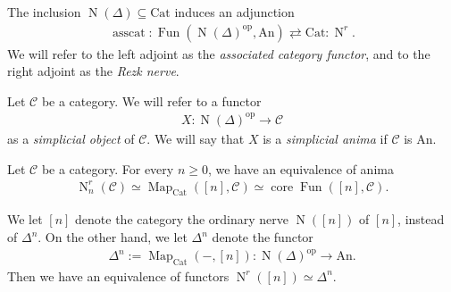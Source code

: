 \documentclass[a4paper,dvipdfmx,11pt,reqno]{amsart}
\DeclareMathOperator{\Map}{Map}
\DeclareMathOperator{\myop}{op}
\DeclareMathOperator{\N}{N}
\DeclareMathOperator{\Fun}{Fun}
\DeclareMathOperator{\core}{core}
\DeclareMathOperator{\asscat}{asscat}
\newcommand{\C}{\mathcal{C}}
\newcommand{\An}{\mathrm{An}}
\newcommand{\Cat}{\mathrm{Cat}}
\begin{document}
\begin{definition}
  The inclusion $\N(\Delta) \subseteq \Cat$ induces an adjunction 
  \begin{align*}
    \asscat : \Fun(\N(\Delta)^{\myop},\An) \rightleftarrows \Cat : \N^r.
  \end{align*}
  We will refer to the left adjoint as the \textit{associated category functor}, and to the right adjoint as the \textit{Rezk nerve}.
\end{definition}

\begin{definition}
  Let $\C$ be a category.
  We will refer to a functor 
  \begin{align*}
    X : \N(\Delta)^{\myop} \to \C
  \end{align*}
  as a \textit{simplicial object} of $\C$.
  We will say that $X$ is a \textit{simplicial anima} if $\C$ is $\An$.
\end{definition}

\begin{remark}
  Let $\C$ be a category.
  For every $n \geq 0$, we have an equivalence of anima
  \begin{align*}
    \N^r_n(\C) \simeq \Map_{\Cat}([n],\C) \simeq \core\Fun([n],\C).
  \end{align*}
\end{remark}

\begin{notation}
  We let $[n]$ denote the category the ordinary nerve $\N([n])$ of $[n]$, instead of $\Delta^n$.
  On the other hand, we let $\Delta^n$ denote the functor 
  \begin{align*}
    \Delta^n := \Map_{\Cat}(-,[n]) : \N(\Delta)^{\myop} \to \An.
  \end{align*}
  Then we have an equivalence of functors $\N^r([n]) \simeq \Delta^n$.
\end{notation}
\end{document}
